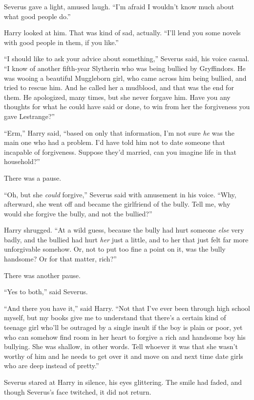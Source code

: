 Severus gave a light, amused laugh. “I’m afraid I wouldn’t know much about what
good people do.”

Harry looked at him. That was kind of sad, actually. “I’ll lend you some novels
with good people in them, if you like.”

“I should like to ask your advice about something,” Severus said, his voice
casual. “I know of another fifth-year Slytherin who was being bullied by
Gryffindors. He was wooing a beautiful Muggleborn girl, who came across him
being bullied, and tried to rescue him. And he called her a mudblood, and that
was the end for them. He apologized, many times, but she never forgave him.
Have you any thoughts for what he could have said or done, to win from her the
forgiveness you gave Lestrange?”

“Erm,” Harry said, “based on only that information, I’m not sure \emph{he} was
the main one who had a problem. I’d have told him not to date someone that
incapable of forgiveness. Suppose they’d married, can you imagine life
in that household?”

There was a pause.

“Oh, but she \emph{could} forgive,” Severus said with amusement in his voice.
“Why, afterward, she went off and became the girlfriend of the bully. Tell me,
why would she forgive the bully, and not the bullied?”

Harry shrugged. “At a wild guess, because the bully had hurt someone
\emph{else} very badly, and the bullied had hurt \emph{her} just a little, and
to her that just felt far more unforgivable somehow. Or, not to put too fine a
point on it, was the bully handsome? Or for that matter, rich?”

There was another pause.

“Yes to both,” said Severus.

“And there you have it,” said Harry. “Not that I’ve ever been through high
school myself, but my books give me to understand that there’s a certain kind
of teenage girl who’ll be outraged by a single insult if the boy is plain or
poor, yet who can somehow find room in her heart to forgive a rich and handsome
boy his bullying. She was shallow, in other words. Tell whoever it was that she
wasn’t worthy of him and he needs to get over it and move on and next time date
girls who are deep instead of pretty.”

Severus stared at Harry in silence, his eyes glittering. The smile had faded,
and though Severus’s face twitched, it did not return.

